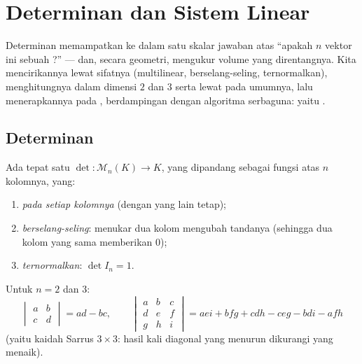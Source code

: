 \chapter{Determinan dan Sistem Linear}\label{ch:b1:det}

Determinan memampatkan ke dalam satu skalar jawaban atas ``apakah
$n$ vektor ini sebuah ?'' --- dan, secara geometri, mengukur volume
yang direntangnya. Kita mencirikannya lewat sifatnya (multilinear,
berselang-seling, ternormalkan), menghitungnya dalam dimensi $2$ dan $3$ serta lewat
 pada umumnya, lalu menerapkannya pada ,
berdampingan dengan algoritma serbaguna: yaitu .

\section{Determinan}

\begin{theorem}[Pencirian]\label{thm:b1:det:def}
Ada tepat satu  $\det \colon \mathcal{M}_n(K) \to K$,
yang dipandang sebagai fungsi atas $n$ kolomnya, yang:
\begin{enumerate}
  \item \emph{ pada setiap kolomnya} (dengan yang lain tetap);
  \item \emph{berselang-seling}: menukar dua kolom mengubah tandanya
        (sehingga dua kolom yang sama memberikan $0$);
  \item \emph{ternormalkan}: $\det I_n = 1$.
\end{enumerate}
Untuk $n = 2$ dan $3$:
\[
\begin{vmatrix} a & b\\ c & d\end{vmatrix} = ad - bc,
\qquad
\begin{vmatrix} a & b & c\\ d & e & f\\ g & h & i\end{vmatrix}
= aei + bfg + cdh - ceg - bdi - afh
\]
(yaitu kaidah Sarrus $3 \times 3$: hasil kali diagonal yang menurun
dikurangi yang menaik).
\end{theorem}
\admitted

